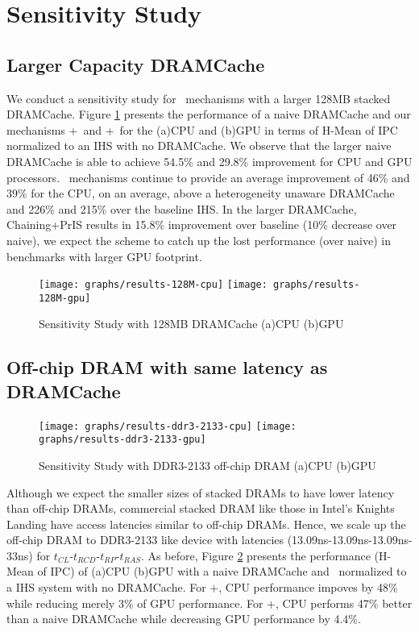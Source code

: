 \section{Sensitivity Study}
\subsection{Larger Capacity DRAMCache}

We conduct a sensitivity study for \cachename\ mechanisms with a larger 128MB stacked DRAMCache. Figure \ref{results-128m} presents the performance of a naive DRAMCache and our mechanisms \bypassname+\prioname\ and \chaining+\prioname\ for the (a)CPU and (b)GPU in terms of H-Mean of IPC normalized to an IHS with no DRAMCache. We observe that the larger naive DRAMCache is able to achieve 54.5\% and 29.8\% improvement for CPU and GPU processors. \cachename\ mechanisms continue to provide an average improvement of 46\% and 39\% for the CPU, on an average, above a heterogeneity unaware DRAMCache and 226\% and 215\% over the baseline IHS. 
In the larger DRAMCache, Chaining+PrIS results in 15.8\% improvement over baseline (10\% decrease over naive), we
expect the scheme to catch up the lost performance (over naive) in benchmarks with larger GPU footprint.

\begin{figure}[!htb]
	\centering
	\texttt{[image: graphs/results-128M-cpu]}
	\texttt{[image: graphs/results-128M-gpu]}
	\caption{Sensitivity Study with 128MB DRAMCache (a)CPU (b)GPU}
	\label{results-128m}
\end{figure}


\subsection{Off-chip DRAM with same latency as DRAMCache}

\begin{figure}[!htb]
	\centering
	\texttt{[image: graphs/results-ddr3-2133-cpu]}
	\texttt{[image: graphs/results-ddr3-2133-gpu]}
	\caption{Sensitivity Study with DDR3-2133 off-chip DRAM (a)CPU (b)GPU}
	\label{results-2xbw}
\end{figure}

Although we expect the smaller sizes of stacked DRAMs to have lower latency than off-chip DRAMs, commercial stacked DRAM like those in Intel's Knights Landing \cite{xeonphi} have access latencies similar to off-chip DRAMs. Hence, we scale up the off-chip DRAM to DDR3-2133 like device with latencies (13.09ns-13.09ns-13.09ns-33ns) for $t_{CL}$-$t_{RCD}$-$t_{RP}$-$t_{RAS}$. As before, Figure \ref{results-2xbw} presents the performance (H-Mean of IPC) of (a)CPU (b)GPU with a naive DRAMCache and \cachename\ normalized to a IHS system with no DRAMCache. For \prioname+\bypassname, CPU performance impoves by 48\% while reducing merely 3\% of GPU performance. For \prioname+\chaining, CPU performs 47\% better than a naive DRAMCache while decreasing GPU performance by 4.4\%.

